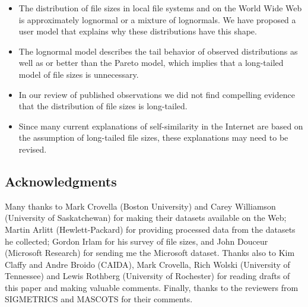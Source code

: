 \documentclass[10pt,twocolumn]{article}
\begin{document}

\begin{itemize}

\item The distribution of file sizes in local file systems
and on the World Wide Web is approximately lognormal
or a mixture of lognormals.
We have proposed a user model that explains why these
distributions have this shape.

\item The lognormal model describes the tail behavior of observed
distributions as well as or better than the Pareto model, which
implies that a long-tailed model of file sizes is unnecessary.

\item In our review of published observations we did not find
compelling evidence that the distribution of file sizes is
long-tailed.

\item Since many current explanations of self-similarity in the
Internet are based on the assumption of long-tailed file sizes,
these explanations may need to be revised.

\end{itemize}

\subsection*{Acknowledgments}

Many thanks to Mark Crovella (Boston University) and Carey Williamson
(University of Saskatchewan) for making their datasets available on
the Web; Martin Arlitt (Hewlett-Packard) for providing processed data
from the datasets he collected; Gordon Irlam for his survey of file
sizes, and John Douceur (Microsoft Research) for sending me the
Microsoft dataset.  Thanks also to Kim Claffy and Andre Broido
(CAIDA), Mark Crovella, Rich Wolski (University of Tennessee) and
Lewis Rothberg (University of Rochester) for reading drafts of this
paper and making valuable comments.  Finally, thanks to the reviewers
from SIGMETRICS and MASCOTS for their comments.




\end{document}
